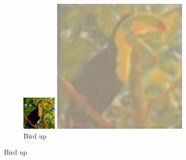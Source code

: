 \documentclass[11pt,twocolumn,twoside,paper=a4]{IEEEtran}
\begin{document}
\begin{figure}[ht]
\par\bigskip

\begin{subfigure}{0.45\textwidth}
  \centering
  \begin{minipage}[b]{0.45\textwidth}
    \includegraphics[width=\textwidth]{../images/bird_low.jpg}
    \caption{Bird low}
    \label{fig:bird_low}
  \end{minipage}
  \hfill
  \begin{minipage}[b]{0.45\textwidth}
    \includegraphics[width=\textwidth]{../images/bird_up.jpg}
    \caption{Bird up}
    \label{fig:bird_up}
  \end{minipage}
\end{subfigure}


\end{figure}
\end{document}
